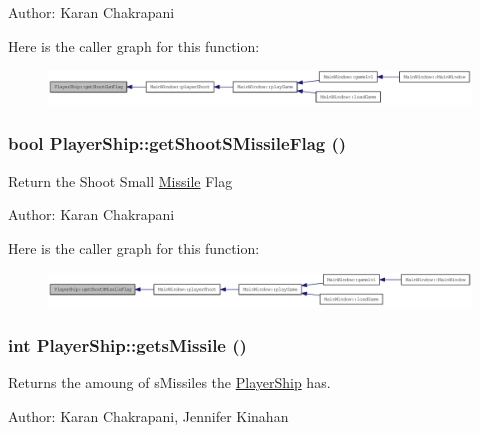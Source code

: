 Author: Karan Chakrapani 

Here is the caller graph for this function:\nopagebreak
\begin{figure}[H]
\begin{center}
\leavevmode
\includegraphics[width=420pt]{class_player_ship_ae5bc443b4609f8f0b691425960a9a419_icgraph}
\end{center}
\end{figure}
\hypertarget{class_player_ship_a06484c119b8aec9bd2b6758bb630c942}{
\subsubsection[{getShootSMissileFlag}]{\setlength{\rightskip}{0pt plus 5cm}bool PlayerShip::getShootSMissileFlag ()}}
\label{class_player_ship_a06484c119b8aec9bd2b6758bb630c942}
Return the Shoot Small \hyperlink{class_missile}{Missile} Flag

Author: Karan Chakrapani 

Here is the caller graph for this function:\nopagebreak
\begin{figure}[H]
\begin{center}
\leavevmode
\includegraphics[width=420pt]{class_player_ship_a06484c119b8aec9bd2b6758bb630c942_icgraph}
\end{center}
\end{figure}
\hypertarget{class_player_ship_a57d57596b57715d14fc4c488b3911aef}{
\subsubsection[{getsMissile}]{\setlength{\rightskip}{0pt plus 5cm}int PlayerShip::getsMissile ()}}
\label{class_player_ship_a57d57596b57715d14fc4c488b3911aef}
Returns the amoung of sMissiles the \hyperlink{class_player_ship}{PlayerShip} has.

Author: Karan Chakrapani, Jennifer Kinahan 

